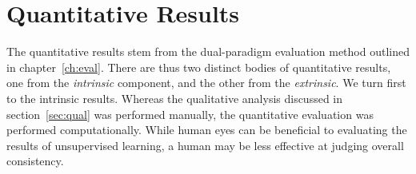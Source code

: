 %

\section{Quantitative Results}
The quantitative results stem from the dual-paradigm evaluation method outlined in chapter~\ref{ch:eval}. 
There are thus two distinct bodies of quantitative results, one from the \emph{intrinsic} component, and 
the other from the \emph{extrinsic}. We turn first to the intrinsic results.
Whereas the qualitative analysis discussed in section~\ref{sec:qual} was performed 
manually, the quantitative evaluation was performed computationally.
While human eyes can be beneficial to evaluating the results of unsupervised learning, 
a human may be less effective at judging overall consistency. 

